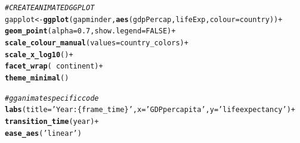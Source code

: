 \documentclass{article}\usepackage[]{graphicx}\usepackage[]{xcolor}
\makeatletter
\newcommand{\hlnum}[1]{\textcolor[rgb]{0.686,0.059,0.569}{#1}}%
\newcommand{\hlstr}[1]{\textcolor[rgb]{0.192,0.494,0.8}{#1}}%
\newcommand{\hlcom}[1]{\textcolor[rgb]{0.678,0.584,0.686}{\textit{#1}}}%
\newcommand{\hlopt}[1]{\textcolor[rgb]{0,0,0}{#1}}%
\newcommand{\hlstd}[1]{\textcolor[rgb]{0.345,0.345,0.345}{#1}}%
\newcommand{\hlkwb}[1]{\textcolor[rgb]{0.69,0.353,0.396}{#1}}%
\newcommand{\hlkwc}[1]{\textcolor[rgb]{0.333,0.667,0.333}{#1}}%
\newcommand{\hlkwd}[1]{\textcolor[rgb]{0.737,0.353,0.396}{\textbf{#1}}}%
\newenvironment{kframe}{%
 \def\at@end@of@kframe{}%
 \ifinner\ifhmode%
  \def\at@end@of@kframe{\end{minipage}}%
  \begin{minipage}{\columnwidth}%
 \fi\fi%
 \def\FrameCommand##1{\hskip\@totalleftmargin \hskip-\fboxsep
 \colorbox{shadecolor}{##1}\hskip-\fboxsep
     \hskip-\linewidth \hskip-\@totalleftmargin \hskip\columnwidth}%
 \MakeFramed {\advance\hsize-\width
   \@totalleftmargin\z@ \linewidth\hsize
   \@setminipage}}%
 {\par\unskip\endMakeFramed%
 \at@end@of@kframe}
\newenvironment{knitrout}{}{} %
\numberwithin{equation}{section}
\makeatother
\begin{document}
\begin{knitrout}\scriptsize
{}\color{fgcolor}\begin{kframe}
\begin{alltt}
\hlcom{# CREATE ANIMATED GGPLOT}
\hlstd{gapplot}\hlkwb{<-}\hlkwd{ggplot}\hlstd{(gapminder,} \hlkwd{aes}\hlstd{(gdpPercap, lifeExp,} \hlkwc{colour} \hlstd{= country))} \hlopt{+}
  \hlkwd{geom_point}\hlstd{(}\hlkwc{alpha} \hlstd{=} \hlnum{0.7}\hlstd{,} \hlkwc{show.legend} \hlstd{=} \hlnum{FALSE}\hlstd{)} \hlopt{+}
  \hlkwd{scale_colour_manual}\hlstd{(}\hlkwc{values} \hlstd{= country_colors)} \hlopt{+}
  \hlkwd{scale_x_log10}\hlstd{()} \hlopt{+}
  \hlkwd{facet_wrap}\hlstd{(}\hlopt{~}\hlstd{continent)} \hlopt{+}
  \hlkwd{theme_minimal}\hlstd{()}

  \hlcom{# gganimate specific code}
  \hlkwd{labs}\hlstd{(}\hlkwc{title} \hlstd{=} \hlstr{'Year: \{frame_time\}'}\hlstd{,} \hlkwc{x} \hlstd{=} \hlstr{'GDP per capita'}\hlstd{,} \hlkwc{y} \hlstd{=} \hlstr{'life expectancy'}\hlstd{)} \hlopt{+}
  \hlkwd{transition_time}\hlstd{(year)} \hlopt{+}
  \hlkwd{ease_aes}\hlstd{(}\hlstr{'linear'}\hlstd{)}
\end{alltt}
\end{kframe}
\end{knitrout}
\end{document}
